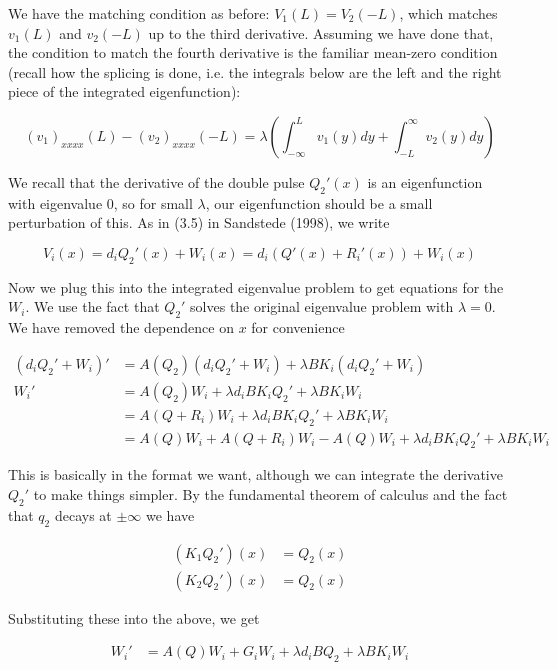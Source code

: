 \documentclass[12pt]{article}
\begin{document}
We have the matching condition as before: $V_1(L) = V_2(-L)$, which matches $v_1(L)$ and $v_2(-L)$ up to the third derivative. Assuming we have done that, the condition to match the fourth derivative is the familiar mean-zero condition (recall how the splicing is done, i.e. the integrals below are the left and the right piece of the integrated eigenfunction):

\[
(v_1)_{xxxx}(L) - (v_2)_{xxxx}(-L) = \lambda \left( \int_{-\infty}^L v_1(y) dy + \int_{-L}^\infty v_2(y)dy \right)
\]

We recall that the derivative of the double pulse $Q_2'(x)$ is an eigenfunction with eigenvalue 0, so for small $\lambda$, our eigenfunction should be a small perturbation of this. As in (3.5) in Sandstede (1998), we write

\begin{equation}
V_i(x) = d_i Q_2'(x) + W_i(x) = d_i (Q'(x) + R_i'(x)) + W_i(x)
\end{equation}

Now we plug this into the integrated eigenvalue problem to get equations for the $W_i$. We use the fact that $Q_2'$ solves the original eigenvalue problem with $\lambda = 0$. We have removed the dependence on $x$ for convenience

\begin{align*}
(d_i Q_2' + W_i)' &= A(Q_2) (d_i Q_2' + W_i) + \lambda B K_i (d_i Q_2' + W_i) \\
W_i' &= A(Q_2) W_i + \lambda d_i B K_i Q_2' + \lambda B K_i W_i \\
&= A(Q + R_i) W_i + \lambda d_i B K_i Q_2' + \lambda B K_i W_i \\
&= A(Q) W_i + A(Q + R_i) W_i  - A(Q) W_i + \lambda d_i B K_i Q_2' + \lambda B K_i W_i 
\end{align*}

This is basically in the format we want, although we can integrate the derivative $Q_2'$ to make things simpler. By the fundamental theorem of calculus and the fact that $q_2$ decays at $\pm \infty$ we have

\begin{align*}
(K_1 Q_2')(x) &= Q_2(x) \\
(K_2 Q_2')(x) &= Q_2(x)
\end{align*}

Substituting these into the above, we get

\begin{align*}
W_i' &= A(Q) W_i + G_i W_i + \lambda d_i B Q_2 + \lambda B K_i W_i
\end{align*}
\end{document}
